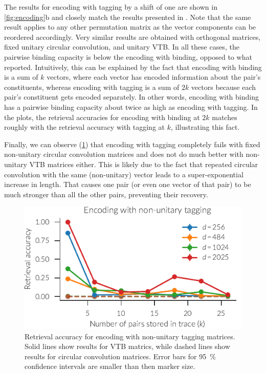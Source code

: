 The results for encoding with tagging by a shift of one are shown in \cref{fig:encoding}b and closely match the results presented in \textcite{recchia2015}.
Note that the same result applies to any other permutation matrix as the vector components can be reordered accordingly.
Very similar results are obtained with orthogonal matrices, fixed unitary circular convolution, and unitary VTB\@.
In all these cases, the pairwise binding capacity is below the encoding with binding, opposed to what \textcite{recchia2015} reported.
Intuitively, this can be explained by the fact that encoding with binding is a sum of $k$ vectors, where each vector has encoded information about the pair's constituents, whereas encoding with tagging is a sum of $2k$ vectors because each pair's constituent gets encoded separately.
In other words, encoding with binding has a pairwise binding capacity about twice as high as encoding with tagging.
In the plots, the retrieval accuracies for encoding with binding at $2k$ matches roughly with the retrieval accuracy with tagging at $k$, illustrating this fact.

Finally, we can observe (\cref{fig:encoding-nonunitary-tagging}) that encoding with tagging completely fails with fixed non-unitary circular convolution matrices and does not do much better with non-unitary VTB matrices either.
This is likely due to the fact that repeated circular convolution with the same (non-unitary) vector leads to a super-exponential increase in length.
That causes one pair (or even one vector of that pair) to be much stronger than all the other pairs, preventing their recovery.
\begin{figure}
    \centering
    \includegraphics{figures/encoding-nonunitary-tagging}
    \caption[Retrieval accuracy of encoding with non-unitary tagging matrices.]{Retrieval accuracy for encoding with non-unitary tagging matrices. Solid lines show results for VTB matrics, while dashed lines show results for circular convolution matrices. Error bars for \SI{95}{\percent} confidence intervals are smaller than then marker size.}\label{fig:encoding-nonunitary-tagging}
\end{figure}

